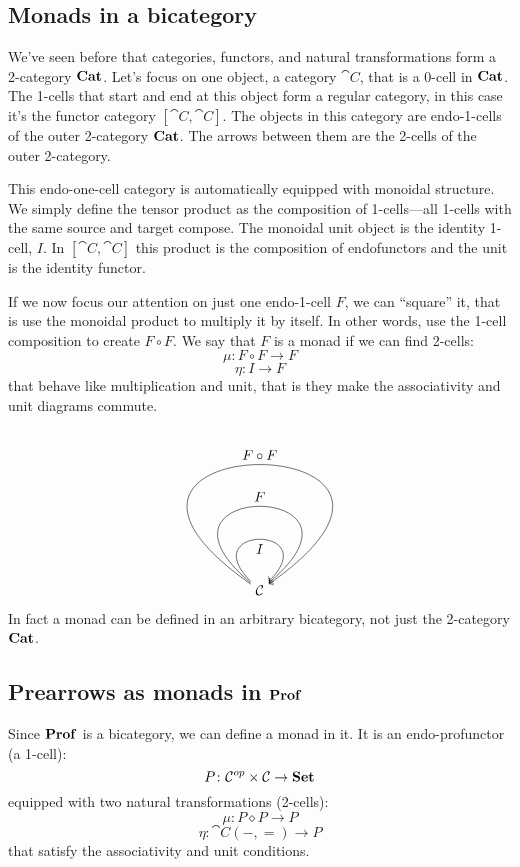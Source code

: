 \documentclass[DaoFP]{subfiles}
\begin{document}
\subsection{Monads in a bicategory}

We've seen before that categories, functors, and natural transformations form a 2-category $\mathbf{Cat}$. Let's focus on one object, a category $\cat C$, that is a 0-cell in $\mathbf{Cat}$. The 1-cells that start and end at this object form a regular category, in this case it's the functor category $[\cat C, \cat C]$. The objects in this category are endo-1-cells of the outer 2-category $\mathbf{Cat}$. The arrows between them are the 2-cells of the outer 2-category.

This endo-one-cell category is automatically equipped with monoidal structure. We simply define the tensor product as the composition of 1-cells---all 1-cells with the same source and target compose. The monoidal unit object is the identity 1-cell, $I$. In $[\cat C, \cat C]$ this product is the composition of endofunctors and the unit is the identity functor. 

If we now focus our attention on just one endo-1-cell $F$, we can ``square'' it, that is use the monoidal product to multiply it by itself. In other words, use the 1-cell composition to create $F \circ F$. We say that $F$ is a monad if we can find 2-cells:
\[ \mu \colon F \circ F \to F \]
\[ \eta \colon I \to F \]
that behave like multiplication and unit, that is they make the associativity and unit diagrams commute. 
\[
   \begin{tikzpicture}
        \node [] (star) {$\cat C$} ;
        \path[->,draw] (star) to  [in=45,out=135, loop,distance=2cm] node[ below] {$I$} (star);
        \path[->,draw] (star) to  [in=40,out=140, loop,distance=4cm] node[above] {$F$} (star);
        \path[->,draw] (star) to  [ in=35,out=145, loop,distance=7cm] node[auto] {$F \circ F$} (star);
    \end{tikzpicture}
\]
In fact a monad can be defined in an arbitrary bicategory, not just the 2-category $\mathbf{Cat}$. 

\subsection{Prearrows as monads in $\mathbf{Prof}$}

Since $\mathbf{Prof}$ is a bicategory, we can define a monad in it. It is an endo-profunctor (a 1-cell):
\[ P \colon \mathcal{C}^{op} \times \mathcal{C} \to \mathbf{Set} \]
equipped with two natural transformations (2-cells):
\[ \mu \colon P \diamond P \to P \]
\[ \eta \colon \cat C(-, =) \to P \]
that satisfy the associativity and unit conditions.
\end{document}

